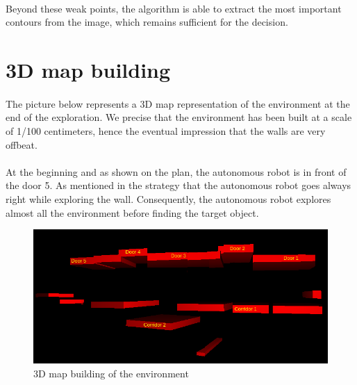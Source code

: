 \documentclass[12pt]{report}
\begin{document}
	\paragraph{}
	Beyond these weak points, the algorithm is able to extract the most important contours from the image, which remains sufficient for the decision. 
	\section{3D map building}
	\paragraph{}
	The picture below represents a 3D map representation of the environment at the end of the exploration. We precise that the environment has been built at a scale of 1/100 centimeters, hence the eventual impression that the walls are very offbeat.
	\paragraph{}
	At the beginning and as shown on the plan, the autonomous robot is in front of the door 5. As mentioned in the strategy that the autonomous robot goes always right while exploring the wall. Consequently, the autonomous robot explores almost all the environment before finding the target object.
	\begin{figure}[H]
		\begin{center}
			\includegraphics[scale=0.90]{res/3D_recons.png}
			\caption{3D map building of the environment}
		\end{center}
	\end{figure}
	
\end{document}
